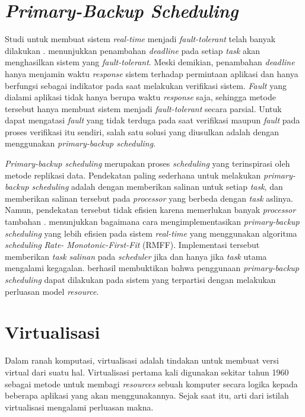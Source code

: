 \section{\textit{Primary-Backup Scheduling}}

Studi untuk membuat sistem \textit{real-time} menjadi \textit{fault-tolerant} telah banyak dilakukan \citep{Campbell1986} \citep{Bertossi2006}. \citet{Campbell1986} menunjukkan penambahan \textit{deadline} pada setiap \textit{task} akan menghasilkan sistem yang \textit{fault-tolerant}.
Meski demikian, penambahan \textit{deadline} hanya menjamin waktu \textit{response} sistem terhadap permintaan aplikasi dan hanya berfungsi sebagai indikator pada saat melakukan verifikasi sistem.
\textit{Fault} yang dialami aplikasi tidak hanya berupa waktu \textit{response} saja, sehingga metode tersebut hanya membuat sistem menjadi \textit{fault-tolerant} secara parsial.
Untuk dapat mengatasi \textit{fault} yang tidak terduga pada saat verifikasi maupun \textit{fault} pada proses verifikasi itu sendiri, salah satu solusi yang diusulkan adalah dengan menggunakan \textit{primary-backup scheduling}.

\textit{Primary-backup scheduling} merupakan proses \textit{scheduling} yang terinspirasi oleh metode replikasi data.
Pendekatan paling sederhana untuk melakukan \textit{primary-backup scheduling} adalah dengan memberikan salinan untuk setiap \textit{task}, dan memberikan salinan tersebut pada \textit{processor} yang berbeda dengan \textit{task} aslinya.
Namun, pendekatan tersebut tidak efisien karena memerlukan banyak \textit{processor} tambahan \citep{Oh1994}.
\citet{Bertossi2006} menunjukkan bagaimana cara mengimplementasikan \textit{primary-backup scheduling} yang lebih efisien pada sistem \textit{real-time} yang menggunakan algoritma \textit{scheduling} \textit{Rate- Monotonic-First-Fit} (RMFF).
Implementasi tersebut memberikan \textit{task} \textit{salinan} pada \textit{scheduler} jika dan hanya jika \textit{task} utama mengalami kegagalan.
\citet{Jin2013} berhasil membuktikan bahwa penggunaan \textit{primary-backup scheduling} dapat dilakukan pada sistem yang terpartisi dengan melakukan perluasan model \textit{resource}.

\section{Virtualisasi}

Dalam ranah komputasi, virtualisasi adalah tindakan untuk membuat versi virtual dari suatu hal.
Virtualisasi pertama kali digunakan sekitar tahun 1960 sebagai metode untuk membagi \textit{resources} sebuah komputer secara logika kepada beberapa aplikasi yang akan menggunakannya.
Sejak saat itu, arti dari istilah virtualisasi mengalami perluasan makna.

